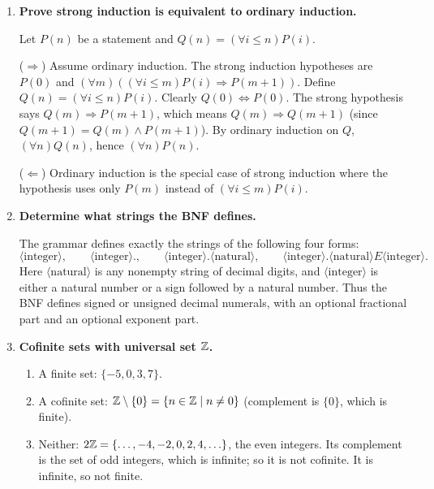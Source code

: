 \begin{enumerate}[{0.}1. ]
\textit{Base case} ($|A|=0$): $\wp(\emptyset)=\{\emptyset\}$, so $|\wp(\emptyset)|=1=2^0$. \checkmark

\textit{Inductive step}: Assume $|\wp(A)|=2^n$ for all sets with $|A|=n$. Let $|B|=n+1$ and pick any $b\in B$. Set $A=B\setminus\{b\}$. Every subset of $B$ either contains $b$ or not. Those not containing $b$ are exactly $\wp(A)$ ($2^n$ of them). Those containing $b$ are in bijection with $\wp(A)$ via $S\mapsto S\setminus\{b\}$ ($2^n$ more). Total: $2^n+2^n=2^{n+1}$. $\square$

\item \textbf{Prove strong induction is equivalent to ordinary induction.}

Let $P(n)$ be a statement and $Q(n) = (\forall i \leq n) P(i)$.

($\Rightarrow$) Assume ordinary induction. The strong induction hypotheses are $P(0)$ and $(\forall m)((\forall i\leq m)P(i)\Rightarrow P(m+1))$. Define $Q(n) = (\forall i\leq n)P(i)$. Clearly $Q(0)\Leftrightarrow P(0)$. The strong hypothesis says $Q(m)\Rightarrow P(m+1)$, which means $Q(m)\Rightarrow Q(m+1)$ (since $Q(m+1) = Q(m)\wedge P(m+1)$). By ordinary induction on $Q$, $(\forall n)Q(n)$, hence $(\forall n)P(n)$.

($\Leftarrow$) Ordinary induction is the special case of strong induction where the hypothesis uses only $P(m)$ instead of $(\forall i\leq m)P(i)$.

\item \textbf{Determine what strings the BNF defines.}

The grammar defines exactly the strings of the following four forms:
\[
\langle\text{integer}\rangle,\qquad
\langle\text{integer}\rangle.,\qquad
\langle\text{integer}\rangle.\langle\text{natural}\rangle,\qquad
\langle\text{integer}\rangle.\langle\text{natural}\rangle E \langle\text{integer}\rangle.
\]
Here $\langle\text{natural}\rangle$ is any nonempty string of decimal digits, and
$\langle\text{integer}\rangle$ is either a natural number or a sign followed by a
natural number. Thus the BNF defines signed or unsigned decimal numerals, with
an optional fractional part and an optional exponent part.

\item \textbf{Cofinite sets with universal set $\mathbb{Z}$.}

\begin{enumerate}
\item A finite set: $\{-5,0,3,7\}$.
\item A cofinite set: $\mathbb{Z}\setminus\{0\} = \{n\in\mathbb{Z} \mid n\neq 0\}$ (complement is $\{0\}$, which is finite).
\item Neither: $2\mathbb{Z} = \{\ldots,-4,-2,0,2,4,\ldots\}$, the even integers. Its complement is the set of odd integers, which is infinite; so it is not cofinite. It is infinite, so not finite.
\end{enumerate}


\end{enumerate}
